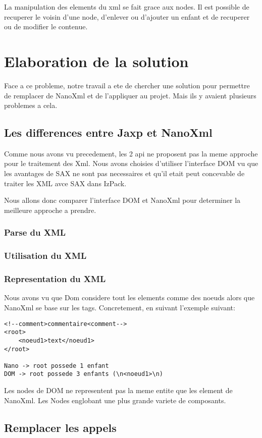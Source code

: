 La manipulation des elements du xml se fait grace aux nodes. Il est possible de recuperer le voisin d'une node, d'enlever ou d'ajouter un enfant et de recuperer ou de modifier le contenue.
\section{Elaboration de la solution}
Face a ce probleme, notre travail a ete de chercher une solution pour permettre de remplacer de NanoXml et de l'appliquer au projet. Mais ils y avaient plusieurs problemes a cela.
\subsection{Les differences entre Jaxp et NanoXml}
Comme nous avons vu precedement, les 2 api ne proposent pas la meme approche pour le traitement des Xml. Nous avons choisies d'utiliser l'interface DOM vu que les avantages de SAX ne sont pas necessaires et qu'il etait peut concevable de traiter les XML avce SAX dans IzPack.

Nous allons donc comparer l'interface DOM et NanoXml pour determiner la meilleure approche a prendre.
\subsubsection{Parse du XML}

\subsubsection{Utilisation du XML}
\subsubsection{Representation du XML}
Nous avons vu que Dom considere tout les elements comme des noeuds alors que NanoXml se base sur les tags. Concretement, en suivant l'exemple suivant:
\begin{verbatim}
<!--comment>commentaire<comment-->
<root>
	<noeud1>text</noeud1>
</root>

Nano -> root possede 1 enfant
DOM -> root possede 3 enfants (\n<noeud1>\n)
\end{verbatim}
Les nodes de DOM ne representent pas la meme entite que les element de NanoXml. Les Nodes englobant une plus grande variete de composants.

\subsection{Remplacer les appels}
